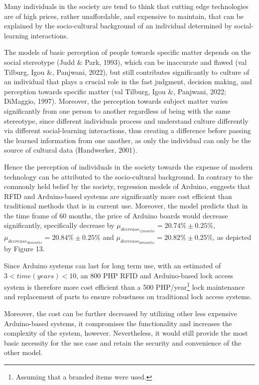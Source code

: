 \documentclass[12pt]{article}
\begin{document}
Many individuals in the society are tend to think that cutting edge technologies are of high prices, rather unaffordable, and expensive to maintain, that can be explained by the socio-cultural background of an individual determined by social-learning interactions.

The models of basic perception of people towards specific matter depends on the social stereotype (Judd \& Park, 1993), which can be inaccurate and flawed (val Tilburg, Igou \&, Panjwani, 2022), but still contributes significantly to culture of an individual that plays a crucial role in the fast judgment, decision making, and perception towards specific matter (val Tilburg, Igou \&, Panjwani, 2022; DiMaggio, 1997). Moreover, the perception towards subject matter varies significantly from one person to another regardless of being with the same stereotype, since different individuals process and understand culture differently via different social-learning interactions, thus creating a difference before passing the learned information from one another, as only the individual can only be the source of cultural data (Handwerker, 2001).

Hence the perception of individuals in the society towards the expense of modern technology can be attributed to the socio-cultural background. In contrary to the commonly held belief by the society,  regression models of Arduino, suggests that RFID and Arduino-based systems are significantly more cost efficient than traditional methods that is in current use. Moreover, the model predicts that in the time frame of 60 months, the price of Arduino boards would decrease significantly, specifically decrease by $\mu_{decrease_{12 months}} = 20.74\% \pm 0.25\%$, $\mu_{decrease_{36 months}} = 20.84\% \pm 0.25\%$ and $\mu_{decrease_{60 months}} = 20.82\% \pm 0.25\%$, as depicted by Figure 13.

Since Arduino systems can last for long term use, with an estimated of $3 < time (years) < 10$, an 800 PHP RFID and Arduino-based lock access system is therefore more cost efficient than a 500 PHP/year\footnote{Assuming that a branded items were used.} lock maintenance and replacement of parts to ensure robustness on traditional lock access systems.

Moreover, the cost can be further decreased by utilizing other less expensive Arduino-based systems, it compromises the functionality and increases the complexity of the system, however. Nevertheless, it would still provide the most basic necessity for the use case and retain the security and convenience of the other model.
\end{document}
